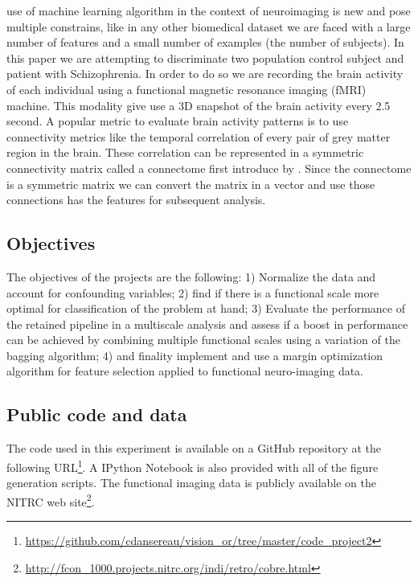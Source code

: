 \documentclass[12pt,journal,compsoc]{IEEEtran}
\begin{document}
 use of machine learning algorithm in the context of neuroimaging is new and pose multiple constrains, like in any other biomedical dataset we are faced with a large number of features and a small number of examples (the number of subjects). In this paper we are attempting to discriminate two population control subject and patient with Schizophrenia. In order to do so we are recording the brain activity of each individual using a functional magnetic resonance imaging (fMRI) machine. This modality give use a 3D snapshot of the brain activity every 2.5 second. A popular metric to evaluate brain activity patterns is to use connectivity metrics like the temporal correlation of every pair of grey matter region in the brain. These correlation can be represented in a symmetric connectivity matrix called a connectome first introduce by \cite{Sporns2005, Hagmann2005}. Since the connectome is a symmetric matrix we can convert the matrix in a vector and use those connections has the features for subsequent analysis.



\subsection{Objectives}
The objectives of the projects are the following: 1) Normalize the data and account for confounding variables; 2) find if there is a functional scale more optimal for classification of the problem at hand; 3) Evaluate the performance of the retained pipeline in a multiscale analysis and assess if a boost in performance can be achieved by combining multiple functional scales using a variation of the bagging algorithm; 4) and finality implement and use a margin optimization algorithm for feature selection applied to functional neuro-imaging data.

\subsection{Public code and data}
The code used in this experiment is available on a 
GitHub repository at the following URL\footnote{\url{https://github.com/cdansereau/vision_or/tree/master/code_project2}}. A IPython Notebook is also provided with all of the figure generation scripts. The functional imaging data is publicly available on the NITRC web site\footnote{\url{http://fcon_1000.projects.nitrc.org/indi/retro/cobre.html}}.
\end{document}
